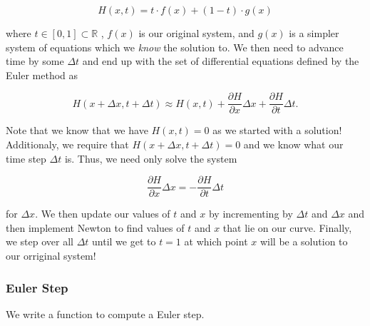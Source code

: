 \documentclass[11pt]{article}
\begin{document}
\[
    H(x,t) = t \cdot f(x) + (1 - t) \cdot g(x)
\]

where \(t \in [0,1] \subset \mathbb{R}\) , \(f(x)\) is our original
system, and \(g(x)\) is a simpler system of equations which we
\emph{know} the solution to. We then need to advance time by some
\(\Delta t\) and end up with the set of differential equations defined
by the Euler method as

\[
    H(x + \Delta x, t + \Delta t) \approx H(x,t) + \frac{\partial H}{\partial x} \Delta x
 + \frac{\partial H}{\partial t} \Delta t. 
 \]

Note that we know that we have \(H(x,t) = 0\) as we started with a
solution! Additionaly, we require that
\(H(x + \Delta x, t + \Delta t) = 0\) and we know what our time step
\(\Delta t\) is. Thus, we need only solve the system

\[
    \frac{\partial H}{\partial x} \Delta x = -\frac{\partial H}{\partial t} \Delta t
\]

for \(\Delta x\). We then update our values of \(t\) and \(x\) by
incrementing by \(\Delta t\) and \(\Delta x\) and then implement Newton
to find values of \(t\) and \(x\) that lie on our curve. Finally, we
step over all \(\Delta t\) until we get to \(t = 1\) at which point
\(x\) will be a solution to our orriginal system!

    \hypertarget{euler-step}{%
\subsubsection{Euler Step}\label{euler-step}}

We write a function to compute a Euler step.
\end{document}
